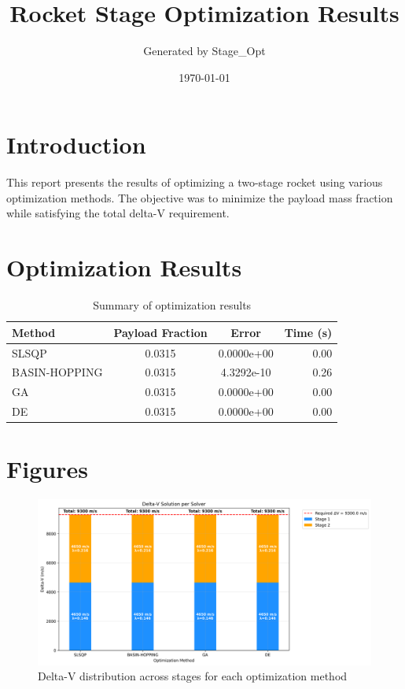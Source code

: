 \documentclass{article}
\title{Rocket Stage Optimization Results}
\author{Generated by Stage\_Opt}
\date{\today}
\begin{document}
\maketitle

\section{Introduction}
This report presents the results of optimizing a two-stage rocket using various optimization methods. The objective was to minimize the payload mass fraction while satisfying the total delta-V requirement.

\section{Optimization Results}
\begin{table}[H]
\centering
\begin{tabular}{lccr}
\toprule
Method & Payload Fraction & Error & Time (s) \\
\midrule
SLSQP & 0.0315 & 0.0000e+00 & 0.00 \\
BASIN-HOPPING & 0.0315 & 4.3292e-10 & 0.26 \\
GA & 0.0315 & 0.0000e+00 & 0.00 \\
DE & 0.0315 & 0.0000e+00 & 0.00 \\
\bottomrule
\end{tabular}
\caption{Summary of optimization results}
\label{tab:results}
\end{table}

\section{Figures}
\begin{figure}[H]
\centering
\includegraphics[width=\textwidth]{dv_breakdown.png}
\caption{Delta-V distribution across stages for each optimization method}
\label{fig:dv-breakdown}
\end{figure}
\end{document}
